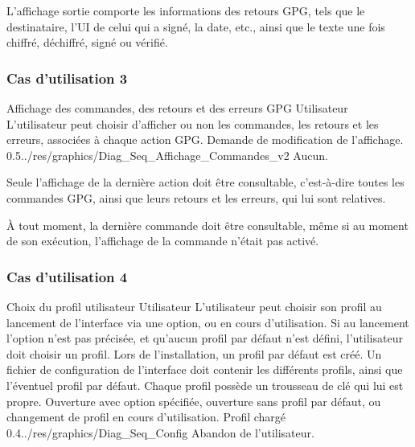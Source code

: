 \documentclass{../res/univ-projet}
\begin{document}
L'affichage sortie comporte les informations des retours GPG, tels que le destinataire, l'UI de celui qui a signé, la date, etc., ainsi que le texte une fois chiffré, déchiffré, signé ou vérifié.

\subsubsection{Cas d'utilisation 3}
\ficheGraphic
{Affichage des commandes, des retours et des erreurs GPG}
{Utilisateur}
{L'utilisateur peut choisir d'afficher ou non les commandes, les retours et les erreurs, associées à chaque action GPG.}
{}
{Demande de modification de l'affichage.}
{}
{0.5}{../res/graphics/Diag_Seq_Affichage_Commandes_v2}
{Aucun.}   
\vspace{0.5cm}

Seule l'affichage de la dernière action doit être consultable, c'est-à-dire toutes les commandes GPG, ainsi que leurs retours et les erreurs, qui lui sont relatives.

\`{A} tout moment, la dernière commande doit être consultable, même si au moment de son exécution, l'affichage de la commande n'était pas activé.


\subsubsection{Cas d'utilisation 4}
\ficheGraphic
{Choix du profil utilisateur}
{Utilisateur}
{L'utilisateur peut choisir son profil au lancement de l'interface via une option, ou en cours d'utilisation. Si au lancement l'option n'est pas précisée, 
et qu'aucun profil par défaut n'est défini, l'utilisateur doit choisir un profil. Lors de l'installation, un profil par défaut est créé.}
{Un fichier de configuration de l'interface doit contenir les différents profils, ainsi que l'éventuel profil par défaut. 
Chaque profil possède un trousseau de clé qui lui est propre.}
{Ouverture avec option spécifiée, ouverture sans profil par défaut, ou changement de profil en cours d'utilisation.}
{Profil chargé}
{0.4}{../res/graphics/Diag_Seq_Config}
{Abandon de l'utilisateur.}
\vspace{0.5cm}
\end{document}
